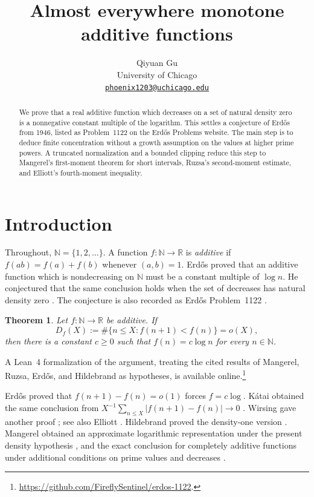 \documentclass[11pt]{article}
\title{Almost everywhere monotone additive functions}
\author{Qiyuan Gu\\
University of Chicago\\
\href{mailto:phoenix1203@uchicago.edu}{\texttt{phoenix1203@uchicago.edu}}}
\date{}
\numberwithin{equation}{section}
\newtheorem{theorem}{Theorem}[section]
\newcommand{\N}{\mathbb N}
\newcommand{\R}{\mathbb R}
\begin{document}
\maketitle

\begin{abstract}
We prove that a real additive function which decreases on a set of
natural density zero is a nonnegative constant multiple of the logarithm.
This settles a conjecture of Erd\H{o}s from 1946, listed as Problem~1122
on the Erd\H{o}s Problems website. The main step is to deduce finite
concentration without a growth assumption on the values at higher prime powers.
A truncated normalization and a bounded clipping reduce this step to
Mangerel's first-moment theorem for short intervals, Ruzsa's
second-moment estimate, and Elliott's fourth-moment inequality.
\end{abstract}

\section{Introduction}

Throughout, $\N=\{1,2,\ldots\}$.
A function $f\colon\N\to\R$ is \emph{additive} if
$f(ab)=f(a)+f(b)$ whenever $(a,b)=1$. Erd\H{o}s proved that an additive
function which is nondecreasing on $\N$ must be a constant multiple of
$\log n$. He conjectured that the same conclusion holds when the set of
decreases has natural density zero \cite[p.~3]{Erdos}. The conjecture is
also recorded as Erd\H{o}s Problem~1122 \cite{Problem1122}.

\begin{theorem}\label{thm:main}
Let $f\colon\N\to\R$ be additive. If
\[
 D_f(X):=\#\{n\le X:f(n+1)<f(n)\}=o(X),
\]
then there is a constant $c\ge0$ such that $f(n)=c\log n$ for every
$n\in\N$.
\end{theorem}

A Lean~4 formalization of the argument, treating the cited results of
Mangerel, Ruzsa, Erd\H{o}s, and Hildebrand as hypotheses, is available
online.\footnote{\url{https://github.com/FireflySentinel/erdos-1122}.}

Erd\H{o}s proved that $f(n+1)-f(n)=o(1)$ forces $f=c\log$.
K\'atai obtained the same conclusion from
$X^{-1}\sum_{n\le X}|f(n+1)-f(n)|\to0$ \cite{Katai}.
Wirsing gave another proof \cite{Wirsing};
see also Elliott \cite[Ch.~11, pp.~244--247]{ElliottBook}.
Hildebrand proved the density-one version \cite{Hildebrand}.
Mangerel obtained an approximate logarithmic representation under the
present density hypothesis \cite[Theorem~1.9]{Mangerel}, and the exact
conclusion for completely additive functions under additional conditions
on prime values and decreases \cite[Corollary~1.7]{Mangerel}.
\end{document}
